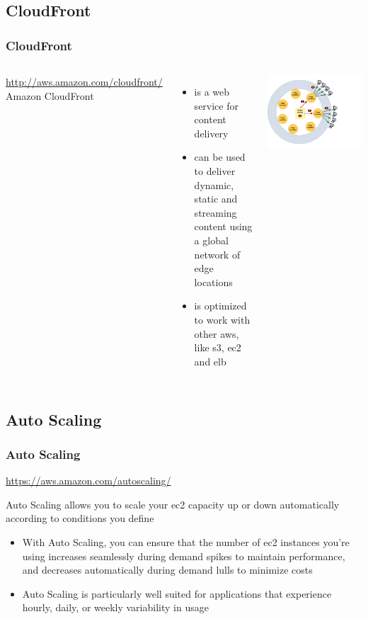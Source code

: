 \documentclass{beamer}
\begin{document}
\subsection{CloudFront}
\begin{frame}
\frametitle[CloudFront]{CloudFront}
\begin{columns}
\url{http://aws.amazon.com/cloudfront/}
 Amazon CloudFront
\begin{itemize}
  \item is a web service for content delivery
  \item can be used to deliver dynamic, static and streaming content using a global network of edge locations
  \item is optimized to work with other \Gls{aws}, like \gls{s3}, \gls{ec2} and \gls{elb}
\end{itemize}
\includegraphics[width= 1.4 \textwidth]{cloudfront.eps}
\end{columns}
\end{frame}
\subsection{Auto Scaling}
\begin{frame}
\frametitle[Auto Scaling]{Auto Scaling}
\url{https://aws.amazon.com/autoscaling/}

Auto Scaling allows you to scale your \gls{ec2} capacity up or down automatically according to conditions you define
\begin{itemize}
\item With Auto Scaling, you can ensure that the number of \gls{ec2} instances you’re using increases seamlessly during demand spikes to maintain performance, and decreases automatically during demand lulls to minimize costs
\item Auto Scaling is particularly well suited for applications that experience hourly, daily, or weekly variability in usage
\end{itemize}
\end{frame}
\end{document}
